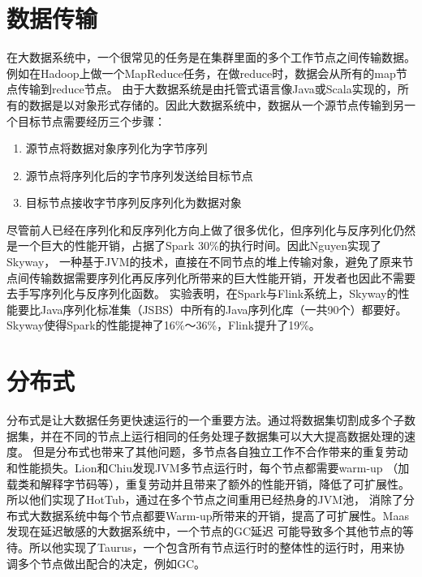 \section{数据传输}
在大数据系统中，一个很常见的任务是在集群里面的多个工作节点之间传输数据。例如在Hadoop上做一个MapReduce任务，在做reduce时，数据会从所有的map节点传输到reduce节点。
由于大数据系统是由托管式语言像Java或Scala实现的，所有的数据是以对象形式存储的。因此大数据系统中，数据从一个源节点传输到另一个目标节点需要经历三个步骤：
\begin{enumerate}
    \item 源节点将数据对象序列化为字节序列
    \item 源节点将序列化后的字节序列发送给目标节点
    \item 目标节点接收字节序列反序列化为数据对象
\end{enumerate}
尽管前人已经在序列化和反序列化方向上做了很多优化，但序列化与反序列化仍然是一个巨大的性能开销，占据了Spark 30\%的执行时间。因此Nguyen实现了Skyway\cite{nguyen2018skyway}，
一种基于JVM的技术，直接在不同节点的堆上传输对象，避免了原来节点间传输数据需要序列化再反序列化所带来的巨大性能开销，开发者也因此不需要去手写序列化与反序列化函数。
实验表明，在Spark与Flink系统上，Skyway的性能要比Java序列化标准集（JSBS）中所有的Java序列化库（一共90个）都要好。Skyway使得Spark的性能提神了16\%～36\%，Flink提升了19\%。

\section{分布式}
分布式是让大数据任务更快速运行的一个重要方法。通过将数据集切割成多个子数据集，并在不同的节点上运行相同的任务处理子数据集可以大大提高数据处理的速度。
但是分布式也带来了其他问题，多节点各自独立工作不合作带来的重复劳动和性能损失。Lion和Chiu\cite{lion2016don}发现JVM多节点运行时，每个节点都需要warm-up
（加载类和解释字节码等），重复劳动并且带来了额外的性能开销，降低了可扩展性。所以他们实现了HotTub，通过在多个节点之间重用已经热身的JVM池，
消除了分布式大数据系统中每个节点都要Warm-up所带来的开销，提高了可扩展性。Maas\cite{maas2016taurus, maas2015trash}发现在延迟敏感的大数据系统中，一个节点的GC延迟
可能导致多个其他节点的等待。所以他实现了Taurus，一个包含所有节点运行时的整体性的运行时，用来协调多个节点做出配合的决定，例如GC。










